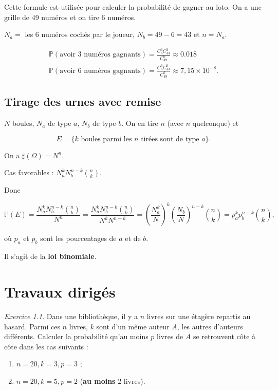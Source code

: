 \documentclass[french]{book}
\theoremstyle{definition}
\theoremstyle{remark}
\newtheorem{exo}{Exercice}
\begin{document}
Cette formule est utilisée pour calculer la probabilité de gagner au loto. On a une grille de 49 numéros et on tire 6 numéros.

$N_a =$ les 6 numéros cochés par le joueur, $N_b = 49-6 = 43$ et $n=N_a$.

\begin{gather*}
  \mathbb{P}( \text{avoir 3 numéros gagnants} ) = \frac{C^{3}_{6} C^{3}_{43}}{C^{6}_{49}} \approx 0.018 \\
  \mathbb{P}( \text{avoir 6 numéros gagnants} ) = \frac{C^{6}_{6} C^{0}_{43}}{C_{49}^{6}} \approx 7,15 \times 10 ^{-8}.
\end{gather*}

\section{Tirage des urnes avec remise}

$N$ boules, $N_a$ de type $a$, $N_b$ de type $b$. On en tire $n$ (avec $n$ quelconque) et

\begin{equation*}
  E = \{ k \text{ boules parmi les } n \text{ tirées sont de type } a  \}.
\end{equation*}

On a $\sharp(\Omega) = N ^{n}$.

Cas favorables : $N_a ^{k} N_b ^{n-k} \binom{n}{k}$.

Donc

\begin{equation*}
  \mathbb{P}( E ) = \frac{N_a ^{k} N_b ^{n-k} \binom{n}{k}}{N ^{n}} = \frac{N_a ^{k} N_b ^{n-k} \binom{n}{k}}{N ^{k} N ^{n-k}} = \left( \frac{N_a ^{k}}{N}\right) ^{k} \left( \frac{N_b}{N}\right) ^{n-k} \binom{n}{k} = p_a ^{k} p_b ^{n-k} \binom{n}{k},
\end{equation*}

où $p_a$ et $p_b$ sont les pourcentages de $a$ et de $b$.

Il s'agit de la \textbf{loi binomiale}.


\chapter*{Travaux dirigés}

\begin{exo}
  Dans une bibliothèque, il y a $n$ livres sur une étagère repartis au hasard. Parmi ces $n$ livres, $k$ sont d'un même auteur $A$, les autres d'auteurs différents. Calculer la probabilité qu'au moins $p$ livres de $A$ se retrouvent côte à côte dans les cas suivants :
  \begin{enumerate}
    \item $n=20, k=3, p=3$ ;
    \item $n=20, k=5, p=2$ (\textbf{au moins} 2 livres).
  \end{enumerate}
\end{exo}
\end{document}
